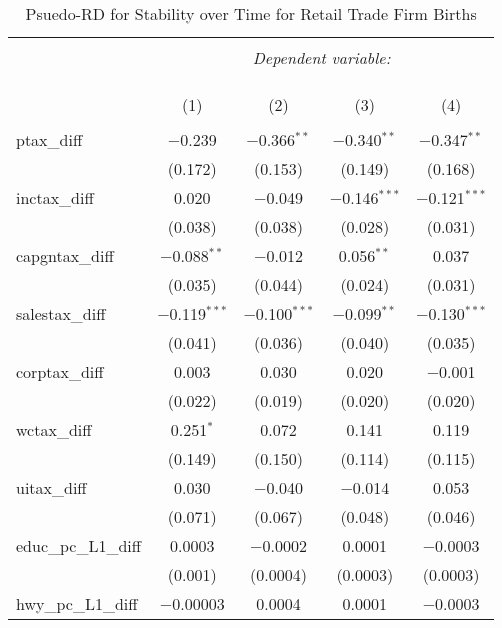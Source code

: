 
\begin{table}[!htbp] \centering 
  \caption{Psuedo-RD for Stability over Time for  Retail Trade Firm Births} 
  \label{} 
\begin{tabular}{@{\extracolsep{5pt}}lcccc} 
\\[-1.8ex]\hline 
\hline \\[-1.8ex] 
 & \multicolumn{4}{c}{\textit{Dependent variable:}} \\ 
\cline{2-5} 
\\[-1.8ex] & \multicolumn{4}{c}{ } \\ 
\\[-1.8ex] & (1) & (2) & (3) & (4)\\ 
\hline \\[-1.8ex] 
 ptax\_diff & $-$0.239 & $-$0.366$^{**}$ & $-$0.340$^{**}$ & $-$0.347$^{**}$ \\ 
  & (0.172) & (0.153) & (0.149) & (0.168) \\ 
  inctax\_diff & 0.020 & $-$0.049 & $-$0.146$^{***}$ & $-$0.121$^{***}$ \\ 
  & (0.038) & (0.038) & (0.028) & (0.031) \\ 
  capgntax\_diff & $-$0.088$^{**}$ & $-$0.012 & 0.056$^{**}$ & 0.037 \\ 
  & (0.035) & (0.044) & (0.024) & (0.031) \\ 
  salestax\_diff & $-$0.119$^{***}$ & $-$0.100$^{***}$ & $-$0.099$^{**}$ & $-$0.130$^{***}$ \\ 
  & (0.041) & (0.036) & (0.040) & (0.035) \\ 
  corptax\_diff & 0.003 & 0.030 & 0.020 & $-$0.001 \\ 
  & (0.022) & (0.019) & (0.020) & (0.020) \\ 
  wctax\_diff & 0.251$^{*}$ & 0.072 & 0.141 & 0.119 \\ 
  & (0.149) & (0.150) & (0.114) & (0.115) \\ 
  uitax\_diff & 0.030 & $-$0.040 & $-$0.014 & 0.053 \\ 
  & (0.071) & (0.067) & (0.048) & (0.046) \\ 
  educ\_pc\_L1\_diff & 0.0003 & $-$0.0002 & 0.0001 & $-$0.0003 \\ 
  & (0.001) & (0.0004) & (0.0003) & (0.0003) \\ 
  hwy\_pc\_L1\_diff & $-$0.00003 & 0.0004 & 0.0001 & $-$0.0003 \\ 

\end{tabular}
\end{table}
